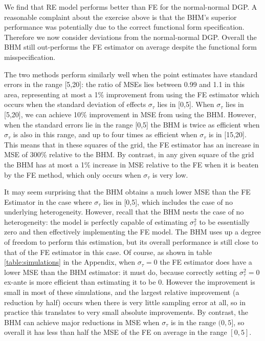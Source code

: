 \documentclass[12pt]{article}
\begin{document}
We find that RE model performs better than FE for the normal-normal DGP. A reasonable complaint about the exercise above is that the BHM's superior performance was potentially due to the correct functional form specification. Therefore we now consider deviations from the normal-normal DGP. Overall the BHM still out-performs the FE estimator on average despite the functional form misspecification.

The two methods perform similarly well when the point estimates have standard errors in the range [5,20]: the ratio of MSEs lies between 0.99 and 1.1 in this area, representing at most a 1\% improvement from using the FE estimator which occurs when the standard deviation of effects $\sigma_{\tau}$ lies in [0,5]. When $\sigma_{\tau}$ lies in [5,20], we can achieve 10\% improvement in MSE from using the BHM. However, when the standard errors lie in the range [0,5] the BHM is twice as efficient when $\sigma_{\tau}$ is also in this range, and up to four times as efficient when $\sigma_{\tau}$ is in [15,20]. This means that in these squares of the grid, the FE estimator has an increase in MSE of 300\% relative to the BHM. By contrast, in any given square of the grid the BHM has at most a 1\% increase in MSE relative to the FE when it is beaten by the FE method, which only occurs when $\sigma_{\tau}$ is very low.

It may seem surprising that the BHM obtains a much lower MSE than the FE Estimator in the case where $\sigma_{\tau}$ lies in [0,5], which includes the case of no underlying heterogeneity. However, recall that the BHM nests the case of no heterogeneity: the model is perfectly capable of estimating $\sigma^2_{\tau}$ to be essentially zero and then effectively implementing the FE model. The BHM uses up a degree of freedom to perform this estimation, but its overall performance is still close to that of the FE estimator in this case. Of course, as shown in table \ref{table:simulations} in the Appendix, when $\sigma_{\tau} = 0$ the FE estimator does have a lower MSE than the BHM estimator: it must do, because correctly setting $\sigma^2_{\tau} = 0$ ex-ante is more efficient than estimating it to be 0. However the improvement is small in most of these simulations, and the largest relative improvement (a reduction by half) occurs when there is very little sampling error at all, so in practice this translates to very small absolute improvements. By contrast, the BHM can achieve major reductions in MSE when $\sigma_{\tau}$ is in the range $(0,5]$, so overall it has less than half the MSE of the FE on average in the range $[0,5]$.
\end{document}

